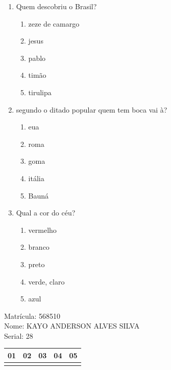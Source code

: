 \documentclass[10pt,a4paper,twocolumn]{report}
\begin{document}
 \begin{enumerate} 
    \item  Quem descobriu o Brasil?





    \begin{enumerate}
    \item  zeze de camargo

\item  jesus

\item  pablo

\item  timão

\item  tirulipa


    \end{enumerate} 
    \item  segundo o ditado popular quem tem boca vai à?





    \begin{enumerate}
    \item  eua

\item  roma

\item  goma

\item  itália

\item  Bauná


    \end{enumerate} 
    \item  Qual a cor do céu?





    \begin{enumerate}
    \item  vermelho

\item  branco

\item  preto

\item  verde, claro

\item  azul


    \end{enumerate}\end{enumerate} 
Matrícula: 568510\\ Nome: KAYO ANDERSON ALVES SILVA \\ Serial: 28\\
\begin{tabular}{|l|l|l|l|l|}\hline
01  &02  &03  &04  &05 \\ \hline 
 & & & & \\ \hline 
\end{tabular}
 \cleardoublepage 
\end{document}
